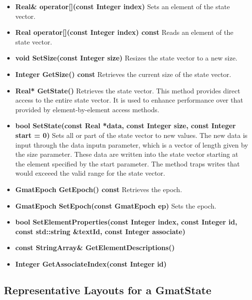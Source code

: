 \begin{itemize}
\item\textbf{Real\& operator[](const Integer index)}  Sets an element of the state vector.
\item\textbf{Real operator[](const Integer index) const}  Reads an element of the state vector.
\item\textbf{void SetSize(const Integer size)}  Resizes the state vector to a new size.
\item\textbf{Integer GetSize() const} Retrieves the current size of the state vector.
\item\textbf{Real* GetState()}  Retrieves the state vector.  This method provides direct access to
the entire state vector.  It is used to enhance performance over that provided by element-by-element
access methods.
\item\textbf{bool SetState(const Real *data, const Integer size, const Integer start = 0)}  Sets
all or part of the state vector to new values.  The new data is input through the data inputn
parameter, which is a vector of length given by the size parameter.  These data are written into
the state vector starting at the element specified by the start parameter.  The method traps writes
that would exceeed the valid range for the state vector.
\item\textbf{GmatEpoch GetEpoch() const}  Retrieves the epoch.
\item\textbf{GmatEpoch SetEpoch(const GmatEpoch ep)}  Sets the epoch.
\item\textbf{bool SetElementProperties(const Integer index, const Integer id, const std::string
\&textId, const Integer associate)}
\item\textbf{const StringArray\& GetElementDescriptions()}
\item\textbf{Integer GetAssociateIndex(const Integer id)}
\end{itemize}

\subsection{\label{section:GmatStateSetup}Representative Layouts for a GmatState}

